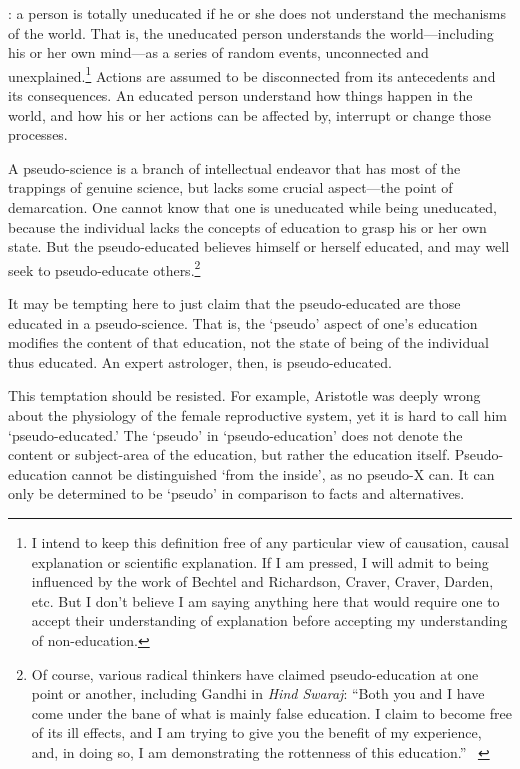 : a person is totally uneducated if he or she does not understand the mechanisms of the world. That is, the uneducated person understands the world---including his or her own mind---as a series of random events, unconnected and unexplained.\footnote{I intend to keep this definition free of any particular view of causation, causal explanation or scientific explanation. If I am pressed, I will admit to being influenced by the work of Bechtel and Richardson, Craver, Craver, Darden, etc. But I don't believe I am saying anything here that would require one to accept their understanding of explanation before accepting my understanding of non-education.} Actions are assumed to be disconnected from its antecedents and its consequences. An educated person understand how things happen in the world, and how his or her actions can be affected by, interrupt or change those processes.

 A pseudo-science is a branch of intellectual endeavor that has most of the trappings of genuine science, but lacks some crucial aspect---the point of demarcation. One cannot know that one is uneducated while being uneducated, because the individual lacks the concepts of education to grasp his or her own state. But the pseudo-educated believes himself or herself educated, and may well seek to pseudo-educate others.\footnote{Of course, various radical thinkers have claimed pseudo-education at one point or another, including Gandhi in \emph{Hind Swaraj}: ``Both you and I have come under the bane of what is mainly false education. I claim to become free of its ill effects, and I am trying to give you the benefit of my experience, and, in doing so, I am demonstrating the rottenness of this education.'' ~\citep[p. 100]{Gandhi:tSEwPMOB}}

It may be tempting here to just claim that the pseudo-educated are those educated in a pseudo-science. That is, the `pseudo' aspect of one's education modifies the content of that education, not the state of being of the individual thus educated. An expert astrologer, then, is pseudo-educated.

This temptation should be resisted. For example, Aristotle was deeply wrong about the physiology of the female reproductive system, yet it is hard to call him `pseudo-educated.' The `pseudo' in `pseudo-education' does not denote the content or subject-area of the education, but rather the education itself. Pseudo-education cannot be distinguished `from the inside', as no pseudo-X can. It can only be determined to be `pseudo' in comparison to facts and alternatives. 

